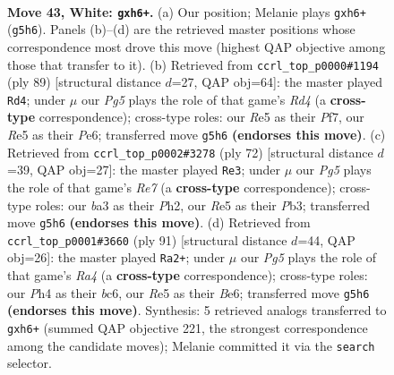 \documentclass[11pt]{article}
\begin{document}
\clearpage

\begin{figure}[p]\centering
\begin{subfigure}{0.46\textwidth}\centering
\resizebox{\linewidth}{!}{%
\newchessgame
\chessboard[
  setfen={8/pp4k1/6p1/4R1Pp/5P1P/b1q2BK1/8/8 w - h6 0 43},
  showmover=false,
  pgfstyle=straightmove, color=movearrow, markmove={g5-h6}
]}
\caption{}
\end{subfigure}\hfill
\begin{subfigure}{0.46\textwidth}\centering
\resizebox{\linewidth}{!}{%
\newchessgame
\chessboard[
  setfen={4Qbk1/5p1p/4p1pP/p2r4/P7/6P1/5P2/5K2 b - - 8 45},
  showmover=false,
  pgfstyle=straightmove, color=movearrow, markmove={d5-d4}
]}
\caption{}
\end{subfigure}
\\[4pt]
\begin{subfigure}{0.46\textwidth}\centering
\resizebox{\linewidth}{!}{%
\newchessgame
\chessboard[
  setfen={8/4R3/6k1/3p3p/8/1P3pP1/5P1P/1q3BK1 w - - 0 37},
  showmover=false,
  pgfstyle=straightmove, color=movearrow, markmove={e7-e3}
]}
\caption{}
\end{subfigure}\hfill
\begin{subfigure}{0.46\textwidth}\centering
\resizebox{\linewidth}{!}{%
\newchessgame
\chessboard[
  setfen={1Q3bk1/5p2/2B1bPp1/r3P2p/7P/6P1/6K1/8 b - - 4 46},
  showmover=false,
  pgfstyle=straightmove, color=movearrow, markmove={a5-a2}
]}
\caption{}
\end{subfigure}
\caption{\textbf{Move 43, White: \texttt{gxh6+}.} (a) Our position; Melanie plays \texttt{gxh6+} (\texttt{g5h6}). Panels (b)--(d) are the retrieved master positions whose correspondence most drove this move (highest QAP objective among those that transfer to it). (b) Retrieved from \texttt{ccrl\_top\_p0000\#1194} (ply 89) [structural distance $d$=27, QAP obj=64]: the master played \texttt{Rd4}; under $\mu$ our \emph{Pg5} plays the role of that game's \emph{Rd4} (a \textbf{cross-type} correspondence); cross-type roles: our \emph{R}e5 as their \emph{P}f7, our \emph{R}e5 as their \emph{P}e6; transferred move \texttt{g5h6} \textbf{(endorses this move)}. (c) Retrieved from \texttt{ccrl\_top\_p0002\#3278} (ply 72) [structural distance $d$=39, QAP obj=27]: the master played \texttt{Re3}; under $\mu$ our \emph{Pg5} plays the role of that game's \emph{Re7} (a \textbf{cross-type} correspondence); cross-type roles: our \emph{b}a3 as their \emph{P}h2, our \emph{R}e5 as their \emph{P}b3; transferred move \texttt{g5h6} \textbf{(endorses this move)}. (d) Retrieved from \texttt{ccrl\_top\_p0001\#3660} (ply 91) [structural distance $d$=44, QAP obj=26]: the master played \texttt{Ra2+}; under $\mu$ our \emph{Pg5} plays the role of that game's \emph{Ra4} (a \textbf{cross-type} correspondence); cross-type roles: our \emph{P}h4 as their \emph{b}c6, our \emph{R}e5 as their \emph{B}e6; transferred move \texttt{g5h6} \textbf{(endorses this move)}. Synthesis: 5 retrieved analogs transferred to \texttt{gxh6+} (summed QAP objective 221, the strongest correspondence among the candidate moves); Melanie committed it via the \texttt{search} selector.}
\label{fig:thought-m84}
\end{figure}
\end{document}

